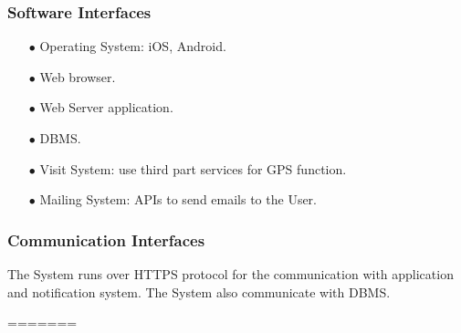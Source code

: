 \documentclass[a4paper, 12pt, oneside]{article}
\begin{document}
\subsubsection{Software Interfaces}
\begin{enumerate}
\item[$\bullet$] Operating System: iOS, Android.
\item[$\bullet$] Web browser.
\item[$\bullet$] Web Server application.
\item[$\bullet$] DBMS.
\item[$\bullet$] Visit System: use third part services for GPS function. 
\item[$\bullet$] Mailing System: APIs to send emails to the User.
\end{enumerate}

\subsubsection{Communication Interfaces}
The System runs over HTTPS protocol for the communication with application and notification system. The System also communicate with DBMS.

=======
\end{document}
